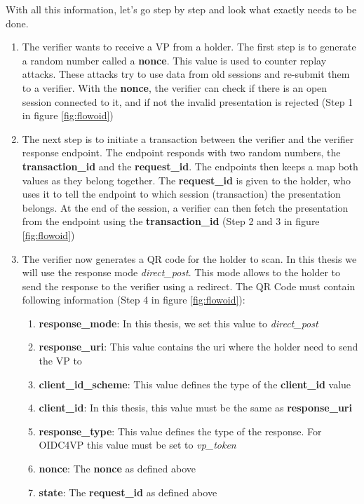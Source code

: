 \documentclass[
	a4paper               %
	,BCOR=0mm            %
	,bibliography=totoc   %
	,listof=totoc         %
	,monolingual
	,twoside=false
]{bfhthesis}              %
\begin{document}
With all this information, let's go step by step and look what exactly needs to be done.

\begin{enumerate}
	\item The verifier wants to receive a VP from a holder. The first step is to generate a random number called a \textbf{nonce}. This value is used to counter replay attacks. These attacks try to use data from old sessions and re-submit them to a verifier. With the \textbf{nonce}, the verifier can check if there is an open session connected to it, and if not the invalid presentation is rejected (Step 1 in figure \ref{fig:flowoid})
	\item The next step is to initiate a transaction between the verifier and the verifier response endpoint. The endpoint responds with two random numbers, the \textbf{transaction\_id} and the \textbf{request\_id}. The endpoints then keeps a map both values as they belong together. The \textbf{request\_id} is given to the holder, who uses it to tell the endpoint to which session (transaction) the presentation belongs. At the end of the session, a verifier can then fetch the presentation from the endpoint using the \textbf{transaction\_id} (Step 2 and 3 in figure \ref{fig:flowoid})
	\item The verifier now generates a QR code for the holder to scan. In this thesis we will use the response mode \textit{direct\_post}. This mode allows to the holder to send the response to the verifier using a redirect. The QR Code must contain following information (Step 4 in figure \ref{fig:flowoid}):
	\begin{enumerate}
		\item \textbf{response\_mode}: In this thesis, we set this value to \textit{direct\_post}
		\item \textbf{response\_uri}: This value contains the uri where the holder need to send the VP to
		\item \textbf{client\_id\_scheme}: This value defines the type of the \textbf{client\_id} value
		\item \textbf{client\_id}: In this thesis, this value must be the same as \textbf{response\_uri}
		\item \textbf{response\_type}: This value defines the type of the response. For OIDC4VP this value must be set to \textit{vp\_token}
		\item \textbf{nonce}: The \textbf{nonce} as defined above
		\item \textbf{state}: The \textbf{request\_id} as defined above

\end{enumerate}
\end{enumerate}
\end{document}
